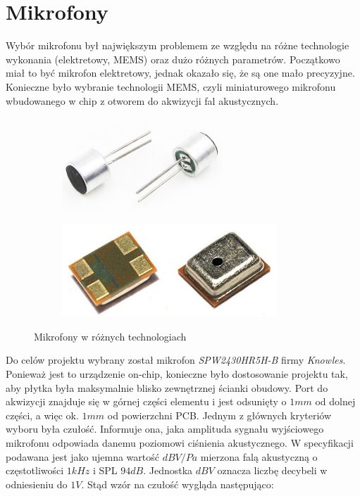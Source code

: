 \section{Mikrofony}
\label{cha:mikrofony}

Wybór mikrofonu był największym problemem ze względu na różne technologie wykonania (elektretowy, MEMS) oraz dużo różnych parametrów. Początkowo miał to być mikrofon elektretowy, jednak okazało się, że są one mało precyzyjne. Konieczne było wybranie technologii MEMS, czyli miniaturowego mikrofonu wbudowanego w chip z otworem do akwizycji fal akustycznych.

\begin{figure}[H]
	\centering
	\begin{subfigure}{.45\textwidth}
		\centering
		\includegraphics[height=3.5cm]{zdjecia/mic_electret.jpg}
	\end{subfigure}
	\begin{subfigure}{.45\textwidth}
		\centering
		\includegraphics[height=3.5cm]{zdjecia/mic_mems.jpg}
	\end{subfigure}
	\caption{\label{mikrofony} Mikrofony w różnych technologiach}
\end{figure}

Do celów projektu wybrany został mikrofon \textit{SPW2430HR5H-B} firmy \textit{Knowles}. Ponieważ jest to urządzenie on-chip, konieczne było dostosowanie projektu tak, aby płytka była maksymalnie blisko zewnętrznej ścianki obudowy. Port do akwizycji znajduje się w górnej części elementu i jest odsunięty o $ 1mm $ od dolnej części, a więc ok. $ 1mm $ od powierzchni PCB.
Jednym z głównych kryteriów wyboru była czułość. Informuje ona, jaka amplituda sygnału wyjściowego mikrofonu odpowiada danemu poziomowi ciśnienia akustycznego. W specyfikacji podawana jest jako ujemna wartość $dBV/Pa$ mierzona falą akustyczną o częstotliwości $1kHz$ i SPL $94dB$. Jednostka $dBV$ oznacza liczbę decybeli w odniesieniu do $1V$\cite{MicSens}. Stąd wzór na czułość wygląda następująco:


